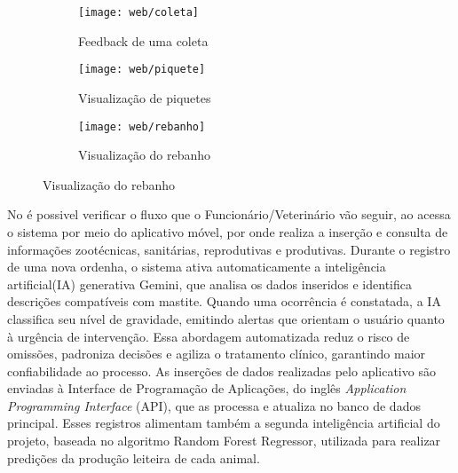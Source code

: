 \begin{figure}[!h]
\caption{Exemplos de telas da plataforma web, mostrando indicadores, piquetes e inventário do rebanho}
\centering
\label{fig:web}
\begin{subfigure}[b]{0.437\textwidth}
    \centering
    \texttt{[image: web/coleta]}
    \caption{Feedback de uma coleta}
    \label{fig:web_coleta}
\end{subfigure}
\hfill
\begin{subfigure}[b]{0.437\textwidth}
    \centering
    \texttt{[image: web/piquete]}
    \caption{Visualização de piquetes}
    \label{fig:web_piquete}
\end{subfigure}

\vspace{0.5cm} %

\begin{subfigure}[b]{0.45\textwidth}
    \centering
    \texttt{[image: web/rebanho]}
    \caption{Visualização do rebanho}
    \label{fig:web_rebanho}
\end{subfigure}

\label{fig:web_exemplos}
\end{figure}



No  é possivel verificar o fluxo que o Funcionário/Veterinário vão seguir, ao acessa o sistema por meio do aplicativo móvel, por onde realiza a inserção e consulta de informações zootécnicas, sanitárias, reprodutivas e produtivas. Durante o registro de uma nova ordenha, o sistema ativa automaticamente a inteligência artificial(IA) generativa Gemini, que analisa os dados inseridos e identifica descrições compatíveis com mastite. Quando uma ocorrência é constatada, a IA classifica seu nível de gravidade, emitindo alertas que orientam o usuário quanto à urgência de intervenção. Essa abordagem automatizada reduz o risco de omissões, padroniza decisões e agiliza o tratamento clínico, garantindo maior confiabilidade ao processo. As inserções de dados realizadas pelo aplicativo são enviadas à Interface de Programação de Aplicações, do inglês \textit{Application Programming Interface} (API), que as processa e atualiza no banco de dados principal. Esses registros alimentam também a segunda inteligência artificial do projeto, baseada no algoritmo Random Forest Regressor, utilizada para realizar predições da produção leiteira de cada animal.

